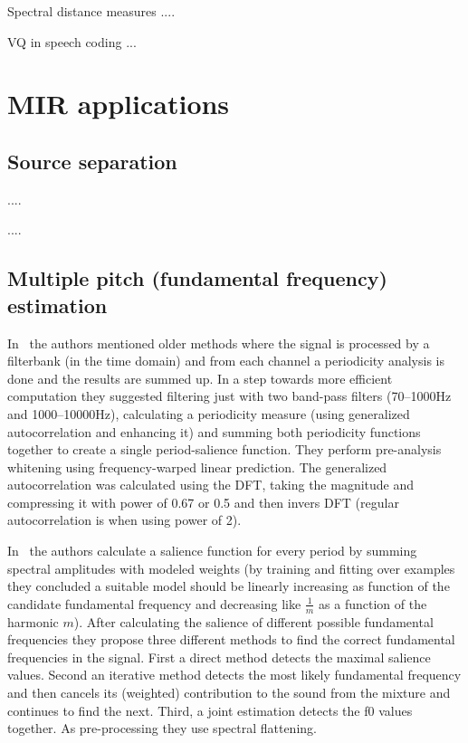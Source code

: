 \documentclass[journal]{IEEEtran}
\begin{document}
Spectral distance measures \cite{viswanathan1976spectralDistance}....

VQ in speech coding \cite{gersho1992vq}...

\section{MIR applications}
\subsection{Source separation}
\cite{slaney1994soundSeparation}....

\cite{ozerov2012general} ....

\subsection{Multiple pitch (fundamental frequency) estimation}
In~\cite{tolonen2000computationally} the authors mentioned older methods where the signal is processed by a filterbank (in the time domain) and from each channel a periodicity analysis is done and the results are summed up. In a step towards more efficient computation they suggested filtering just with two band-pass filters (70--1000Hz and 1000--10000Hz), calculating a periodicity measure (using generalized autocorrelation and enhancing it) and summing both periodicity functions together to create a single period-salience function.
They perform pre-analysis whitening using frequency-warped linear prediction. The generalized autocorrelation was calculated using the DFT, taking the magnitude and compressing it with power of 0.67 or 0.5 and then invers DFT (regular autocorrelation is when using power of 2).

In~\cite{klapuri2006multiple} the authors calculate a salience function for every period by summing spectral amplitudes with modeled weights (by training and fitting over examples they concluded a suitable model should be linearly increasing as function of the candidate fundamental frequency and decreasing like $\frac{1}{m}$ as a function of the harmonic $m$). After calculating the salience of different possible fundamental frequencies they propose three different methods to find the correct fundamental frequencies in the signal. First a direct method detects the maximal salience values. Second an iterative method detects the most likely fundamental frequency and then cancels its (weighted) contribution to the sound from the mixture and continues to find the next. Third, a joint estimation detects the f0 values together.
As pre-processing they use spectral flattening.
\end{document}
